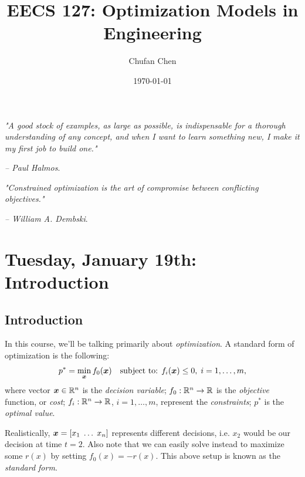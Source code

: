 \documentclass[11 pt]{scrartcl}
\begin{document}
 
\title{\Large EECS 127: Optimization Models in Engineering}
\author{\large Chufan Chen}
\date{\large\today}

\maketitle 

\begin{center}
\begin{displayquote}
    \emph{"A good stock of examples, as large as possible, is indispensable for a thorough understanding of any concept, and when I want to learn something new, I make it my first job to build one."} \\ \begin{flushright} \emph{– Paul Halmos}.  \end{flushright}
\end{displayquote}
\begin{displayquote}
    \emph{"Constrained optimization is the art of compromise between conflicting objectives."} \\ \begin{flushright} \emph{– William A. Dembski}.  \end{flushright}
\end{displayquote}
\end{center}

\tableofcontents 

\newpage

\section{Tuesday, January 19th: Introduction}
\subsection{Introduction}
In this course, we'll be talking primarily about \emph{optimization}. 
A standard form of optimization is the following: 
\[ p^* = \min_{\bm{x}} f_0({\bm{x}})\quad \text{subject to: } f_i({\bm{x}}) \leq 0,\; i=1,\dots, m,\] 
where 
\itemnum
    \ii vector ${\bm{x}}\in \mathbb R^n$ is the \emph{decision variable}; 
    \ii $f_0: \mathbb R^n \to \mathbb R$ is the \emph{objective} function, or \emph{cost}; 
    \ii $f_i: \mathbb R^n\to \mathbb R$, $i=1,\dots, m$, represent the \emph{constraints}; 
    \ii $p^*$ is the \emph{optimal value}. 
\itemend

Realistically, ${\bm{x}} = [x_1\; \dots\; x_n]$ represents different decisions, i.e. $x_2$ would be our decision at time $t=2$. 
Also note that we can easily solve instead to maximize some $r(x)$ by setting $f_0(x) = -r(x)$. 
This above setup is known as the \emph{standard form}. 
\end{document}
